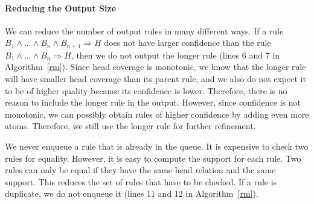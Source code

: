 \paragraph{Reducing the Output Size}  We can reduce the number of output rules in many different ways.
If a rule $B_1 \wedge ... \wedge B_n \wedge B_{n+1} \Rightarrow H$ does not have larger confidence
than the rule $B_1 \wedge ... \wedge B_n \Rightarrow H$, then we do not output the longer rule (lines 6 and 7 in Algorithm~\ref{rm}).
Since head coverage is monotonic, we know that the longer rule will have smaller head coverage than its parent rule, and we also do not expect it to be of higher quality because its confidence is lower. %
Therefore, there is no reason to include the longer rule in the output.
However, since confidence is not monotonic, we can possibly obtain rules of higher confidence by adding even more atoms.
Therefore, we still use the longer rule for further refinement.

We never enqueue a rule that is already in the queue. It is expensive to check two rules for equality.
However, it is easy to compute the support for each rule. Two rules can only be equal if they have the same head relation and
the same support. This reduces the set of rules that have to be checked. If a rule is duplicate, we do not enqueue it (lines 11 and 12 in Algorithm~\ref{rm}).


